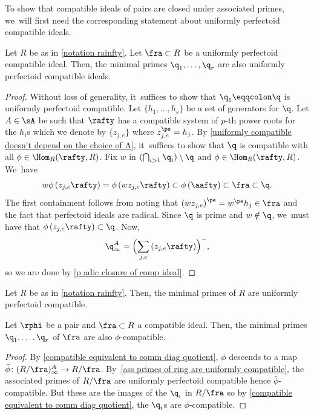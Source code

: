To show that compatible ideals of pairs are closed under associated primes, we~will first need the corresponding statement about uniformly perfectoid compatible ideals.

\begin{proposition}\label{uniform compatible closed under ass primes}
Let $R$ be as in \autoref{notation rainfty}. Let $\fra\subset R$ be a uniformly perfectoid compatible ideal. Then, the minimal primes $\q_1,\ldots,\q_r$ are also uniformly perfectoid compatible ideals.
\end{proposition}

\begin{proof}
Without loss of generality, it~suffices to show that $\q_1\eqqcolon \q$ is uniformly perfectoid compatible. Let $\{h_1,\ldots,h_s\}$ be a set of generators for $\q$. Let $A\in \sA$ be such that $\rafty$ has a compatible system of $p$-th power roots for the $h_i$s which we denote by
$\{z_{j,e}\}$ where $z_{j,e}^\pe=h_j$.
By \autoref{uniformly compatible doesn't depend on the choice of A}, it~suffices to show that $\q$ is compatible with all $\phi\in \Hom_R(\rafty,R)$.
Fix $w$ in $(\bigcap_{i>1} \q_i)\setminus \q$ and $\phi\in \Hom_R(\rafty,R)$. We~have
\[
w\phi\left(z_{j,e} \rafty\right)=\phi\left(wz_{j,e} \rafty\right)\subset \phi\left(\aafty\right)\subset \fra \subset \q.
\]
The first containment follows from noting that $\left(wz_{j,e}\right)^\pe=w^{\pe}h_j \in \fra$ and the fact that perfectoid ideals are radical. Since $\q$ is prime and $w\notin \q$, we~must have that $\phi\left(z_{j,e}\rafty\right)\subset \q$. Now,\vspace*{-3pt}
\[
\q^A_\infty=\Bigl( \sum_{j,e} \left(z_{j,e}\rafty\right) \Bigr)^{-},
\]
so we are done by \autoref{p adic closure of comp ideal}.
\end{proof}

\begin{corollary}\label{ass primes of ring are uniformly compatible}
Let $R$ be as in \autoref{notation rainfty}. Then, the minimal primes of $R$ are uniformly perfectoid compatible.
\end{corollary}

\begin{proposition}\label{compatible ideals of pairs closed under ass primes}
Let $\rphi$ be a pair and $\fra\subset R$ a compatible ideal. Then, the minimal primes $\q_1,\ldots,\q_r$ of $\fra$ are also $\phi$-compatible.
\end{proposition}

\begin{proof}
By \autoref{compatible equivalent to comm diag quotient}, $\phi$ descends to a map $\bar{\phi}\colon (R/\fra)^A_\infty\to R/\fra$. By~\autoref{ass primes of ring are uniformly compatible}, the associated primes of $R/\fra$ are uniformly perfectoid compatible hence $\bar{\phi}$-compatible. But these are the images of the $\q_i$ in $R/\fra$ so by \autoref{compatible equivalent to comm diag quotient}, the $\q_i$s are $\phi$-compatible.
\end{proof}


